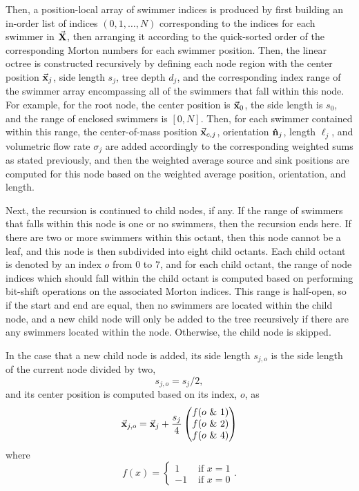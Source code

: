 \documentclass[letterpaper, 10pt, twoside]{LTJournalArticle}
\begin{document}
Then, a position-local array of swimmer indices is produced by first building
an in-order list of indices $(0, 1, \dots, N)$ corresponding to the indices
for each swimmer in $\va{X}$, then arranging it according to the quick-sorted
order of the corresponding Morton numbers for each swimmer position. Then, the
linear octree is constructed recursively by defining each node region with the
center position $\va{x}_j$, side length $s_j$, tree depth $d_j$, and the
corresponding index range of the swimmer array encompassing all of the swimmers
that fall within this node. For example, for the root node, the center position
is $\va{x}_0$, the side length is $s_0$, and the range of enclosed swimmers
is $[0,N]$. Then, for each swimmer contained within this range, the
center-of-mass position $\va{x}_{c,j}$, orientation $\vu{n}_j$, length $\ell_j$,
and volumetric flow rate $\sigma_j$ are added accordingly to the corresponding
weighted sums as stated previously, and then the weighted average source and
sink positions are computed for this node based on the weighted average
position, orientation, and length.

Next, the recursion is continued to child nodes, if any. If the range of
swimmers that falls within this node is one or no swimmers, then the recursion
ends here. If there are two or more swimmers within this octant, then this node
cannot be a leaf, and this node is then subdivided into eight child octants.
Each child octant is denoted by an index $o$ from 0 to 7, and for each child
octant, the range of node indices which should fall within the child octant
is computed based on performing bit-shift operations on the associated Morton
indices. This range is half-open, so if the start and end are equal, then no
swimmers are located within the child node, and a new child node will only be
added to the tree recursively if there are any swimmers located within the node.
Otherwise, the child node is skipped.

In the case that a new child node is added, its side length $s_{j,o}$ is
the side length of the current node divided by two,
\begin{equation}\label{eq-child-octant-side-len}
  s_{j,o} = s_j / 2,
\end{equation}
and its center position is computed based on its index, $o$, as
\begin{equation}\label{eq-child-octant-center}
  \va{x}_{j,o} = \va{x}_j + \frac{s_j}{4}
  \begin{pmatrix}
    f(o \text{ \& } 1) \\
    f(o \text{ \& } 2) \\
    f(o \text{ \& } 4)
  \end{pmatrix}
\end{equation}
where
\begin{equation}
  f(x) = \begin{cases}
     1 &\text{ if } x=1 \\
    -1 &\text{ if } x=0
  \end{cases}.
\end{equation}
\end{document}
